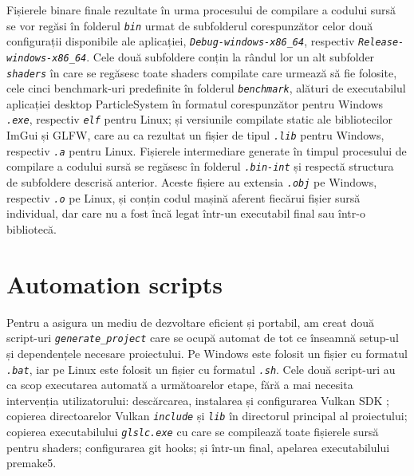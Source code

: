 Fișierele binare finale rezultate în urma procesului de compilare a codului sursă se vor regăsi în folderul \textit{\texttt{bin}} urmat de subfolderul corespunzător celor două configurații disponibile ale aplicației, \textit{\texttt{Debug-windows-x86\_64}}, respectiv \textit{\texttt{Release-windows-x86\_64}}. Cele două subfoldere conțin la rândul lor un alt subfolder \textit{\texttt{shaders}} în care se regăsesc toate shaders compilate care urmează să fie folosite, cele cinci benchmark-uri predefinite în folderul \textit{\texttt{benchmark}}, alături de executabilul aplicației desktop ParticleSystem în formatul corespunzător pentru Windows \textit{\texttt{.exe}}, respectiv \textit{\texttt{elf}} pentru Linux; și versiunile compilate static ale bibliotecilor ImGui și GLFW, care au ca rezultat un fișier de tipul \textit{\texttt{.lib}} pentru Windows, respectiv \textit{\texttt{.a}} pentru Linux. Fișierele intermediare generate în timpul procesului de compilare a codului sursă se regăsesc în folderul \textit{\texttt{.bin-int}} și respectă structura de subfoldere descrisă anterior. Aceste fișiere au extensia \textit{\texttt{.obj}} pe Windows, respectiv \textit{\texttt{.o}} pe Linux, și conțin codul mașină aferent fiecărui fișier sursă individual, dar care nu a fost încă legat într-un executabil final sau într-o bibliotecă. 

\section{Automation scripts}
Pentru a asigura un mediu de dezvoltare eficient și portabil, am creat două script-uri \textit{\texttt{generate\_project}} care se ocupă automat de tot ce înseamnă setup-ul și dependențele necesare proiectului. Pe Windows este folosit un fișier cu formatul \textit{\texttt{.bat}}, iar pe Linux este folosit un fișier cu formatul \textit{\texttt{.sh}}. Cele două script-uri au ca scop executarea automată a următoarelor etape, fără a mai necesita intervenția utilizatorului: descărcarea, instalarea și configurarea Vulkan SDK \cite{VulkanSDK-Windows_citation} \cite{VulkanSDK-Linux_citation}; copierea directoarelor Vulkan \textit{\texttt{include}} și \textit{\texttt{lib}} în directorul principal al proiectului; copierea executabilului \textit{\texttt{glslc.exe}} cu care se compilează toate fișierele sursă pentru shaders; configurarea git hooks; și într-un final, apelarea executabilului premake5. 

